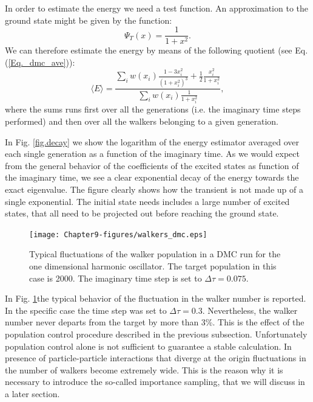 In order to estimate the energy we need a test function. An approximation to the ground state might be given by the function:
\begin{equation}
\Psi_T(x)=\frac{1}{1+x^2}.
\end{equation}
We can therefore estimate the energy by means of the following quotient (see Eq. (\ref{Eq._dmc_ave})):
\begin{equation}
\langle E\rangle = \frac{\sum_{i} w(x_i)\frac{1-3x_i^2}{(1+x_i^2)^3}+\frac{1}{2}\frac{x_i^2}{1+x_i^2}}{\sum_iw(x_i)\frac{1}{1+x_i^2}},
\end{equation}
where the sums runs first over all the generations (i.e. the imaginary time steps performed) and then over all the walkers belonging to a given generation.

In Fig. \ref{fig.decay} we show the logarithm of the energy estimator averaged over each single generation as a function of the imaginary time. As we would expect from the general behavior of the coefficients of the excited states as function of the imaginary time, we see a clear exponential decay of the energy towards the exact eigenvalue. The figure clearly shows how the transient is not made up of a single exponential. The initial state needs includes a large number of excited states, that all need to be projected out before reaching the ground state.
\begin{figure}
	\begin{center}
		\texttt{[image: Chapter9-figures/walkers\_dmc.eps]}
	\end{center}
	\caption{Typical fluctuations of the walker population in a DMC run for the one dimensional harmonic oscillator. The target population in this case is 2000. The imaginary time step is
		set to $\Delta\tau=0.075$. }
	\label{fig.walkers}
\end{figure}
In Fig. \ref{fig.walkers}the typical behavior of the fluctuation in the walker number is reported. In the specific case the time step was set to $\Delta\tau=0.3$. Nevertheless, the walker number never departs from the target by more than 3\%. This is the effect of the population control procedure described in the previous subsection. Unfortunately population control alone is not sufficient to guarantee a stable calculation. In presence of particle-particle interactions that diverge at the origin fluctuations in the number of walkers become extremely wide. This is the reason why it is necessary to introduce the so-called importance sampling, that we will discuss in a later section.
